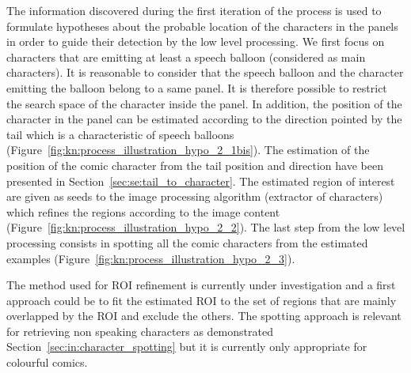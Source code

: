 The information discovered during the first iteration of the process is used to formulate hypotheses about the probable location of the characters in the panels in order to guide their detection by the low level processing.
We first focus on characters that are emitting at least a speech balloon (considered as main characters).
It is reasonable to consider that the speech balloon and the character emitting the balloon belong to a same panel.
It is therefore possible to restrict the search space of the character inside the panel.
In addition, the position of the character in the panel can be estimated according to the direction pointed by the tail which is a characteristic of speech balloons (Figure~\ref{fig:kn:process_illustration_hypo_2_1bis}).
The estimation of the position of the comic character from the tail position and direction have been presented in Section~\ref{sec:se:tail_to_character}.
The estimated region of interest are given as seeds to the image processing algorithm (extractor of characters) which refines the regions according to the image content (Figure~\ref{fig:kn:process_illustration_hypo_2_2}).
The last step from the low level processing consists in spotting all the comic characters from the estimated examples (Figure~\ref{fig:kn:process_illustration_hypo_2_3}).

The method used for ROI refinement is currently under investigation and a first approach could be to fit the estimated ROI to the set of regions that are mainly overlapped by the ROI and exclude the others.
The spotting approach is relevant for retrieving non speaking characters as demonstrated Section~\ref{sec:in:character_spotting} but it is currently only appropriate for colourful comics.



